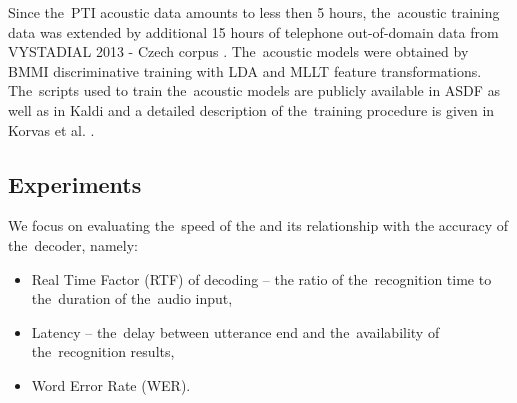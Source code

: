 Since the~PTI acoustic data amounts to less then 5 hours, the~acoustic training data was extended by additional 15 hours of telephone out-of-domain data from VYSTADIAL 2013 - Czech corpus \cite{korvas_2014}.
The~acoustic models were obtained by BMMI discriminative training with LDA and MLLT feature transformations.
The~scripts used to train the~acoustic models are publicly available in ASDF \cite{asdf2014url} as well as in Kaldi \cite{kaldi2014url} and a detailed description of the~training procedure is given in Korvas et al. \cite{korvas_2014}.


\subsection{Experiments}



We focus on evaluating the~speed of the  and its relationship with the accuracy of the~decoder, namely:
\begin{itemize}
    \item Real Time Factor (RTF) of decoding -- the ratio of the~recognition time to the~duration of the~audio input,
    \item Latency -- the~delay between utterance end and the~availability of the~recognition results,
    \item Word Error Rate (WER).
\end{itemize}

